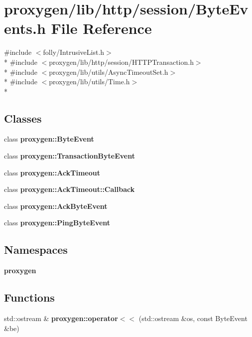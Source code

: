 \section{proxygen/lib/http/session/\+Byte\+Events.h File Reference}
\label{ByteEvents_8h}
{\ttfamily \#include $<$folly/\+Intrusive\+List.\+h$>$}\\*
{\ttfamily \#include $<$proxygen/lib/http/session/\+H\+T\+T\+P\+Transaction.\+h$>$}\\*
{\ttfamily \#include $<$proxygen/lib/utils/\+Async\+Timeout\+Set.\+h$>$}\\*
{\ttfamily \#include $<$proxygen/lib/utils/\+Time.\+h$>$}\\*
\subsection*{Classes}
\begin{DoxyCompactItemize}
\item 
class {\bf proxygen\+::\+Byte\+Event}
\item 
class {\bf proxygen\+::\+Transaction\+Byte\+Event}
\item 
class {\bf proxygen\+::\+Ack\+Timeout}
\item 
class {\bf proxygen\+::\+Ack\+Timeout\+::\+Callback}
\item 
class {\bf proxygen\+::\+Ack\+Byte\+Event}
\item 
class {\bf proxygen\+::\+Ping\+Byte\+Event}
\end{DoxyCompactItemize}
\subsection*{Namespaces}
\begin{DoxyCompactItemize}
\item 
 {\bf proxygen}
\end{DoxyCompactItemize}
\subsection*{Functions}
\begin{DoxyCompactItemize}
\item 
std\+::ostream \& {\bf proxygen\+::operator$<$$<$} (std\+::ostream \&os, const Byte\+Event \&be)
\end{DoxyCompactItemize}
